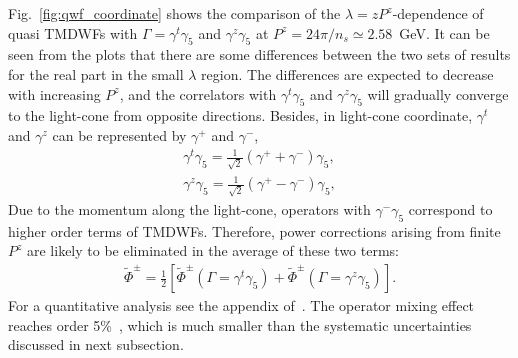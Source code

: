 Fig.~\ref{fig:qwf_coordinate} shows the comparison of the $\lambda= z   P^z$-dependence of quasi TMDWFs with $\Gamma=\gamma^t\gamma_5$ and $\gamma^z\gamma_5$ at $P^z=24\pi/n_s\simeq2.58$~GeV. It can be seen from the plots that there are some differences between the two sets of results for the real part in  the small $\lambda$ region. The differences are expected to decrease with increasing $P^z$, and the correlators with $\gamma^t\gamma_5$ and $\gamma^z\gamma_5$ will gradually converge to the light-cone from opposite directions. Besides, in light-cone coordinate, $\gamma^t$ and $\gamma^z$ can be represented by $\gamma^+$ and $\gamma^-$,
\begin{align}
\gamma^t\gamma_5=\frac{1}{\sqrt{2}}(\gamma^++\gamma^-)\gamma_5,\nonumber\\
\gamma^z\gamma_5=\frac{1}{\sqrt{2}}(\gamma^+-\gamma^-)\gamma_5,
\end{align}
Due to the momentum along the light-cone, operators with $\gamma^-\gamma_5$ correspond to higher order terms of TMDWFs. Therefore, power corrections arising from finite $P^z$ are likely to be eliminated in the average of these two terms:
\begin{align}
\tilde{\Phi}^{\pm}=\frac{1}{2}\left[\tilde{\Phi}^{\pm}\left(\Gamma=\gamma^t\gamma_5\right) + \tilde{\Phi}^{\pm}\left(\Gamma=\gamma^z\gamma_5\right)\right].
\end{align}
For a quantitative analysis see the appendix of~\cite{LatticeParton:2020uhz}. The operator mixing effect reaches order 5\%~\cite{LatticeParton:2020uhz}, which is much smaller than the systematic uncertainties discussed in next subsection. 

